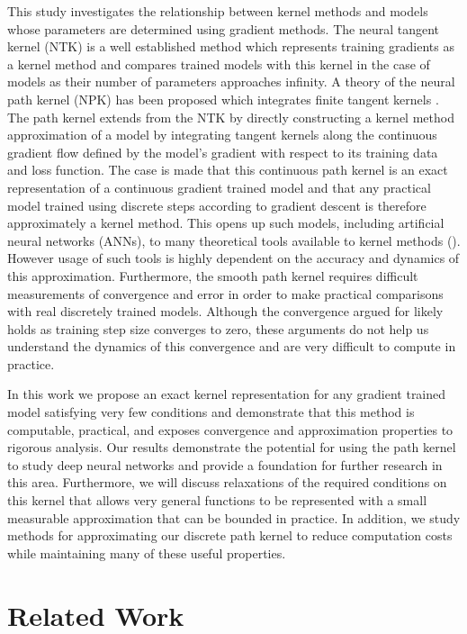 This study investigates the relationship between kernel methods and models whose parameters are determined using gradient methods. The neural tangent kernel (NTK) is a well established method which represents training gradients as a kernel method \cite{jacot2018neural} and compares trained models with this kernel in the case of models as their number of parameters approaches infinity. A theory of the neural path kernel (NPK) has been proposed which integrates finite tangent kernels \cite{domingos2020every}. The path kernel extends from the NTK by directly constructing a kernel method approximation of a model by integrating tangent kernels along the continuous gradient flow defined by the model's gradient with respect to its training data and loss function. The case is made that this continuous path kernel is an exact representation of a continuous gradient trained model and that any practical model trained using discrete steps according to gradient descent is  therefore approximately a kernel method. This opens up such models, including artificial neural networks (ANNs), to many theoretical tools available to kernel methods (\cite{ghojogh2021, shawe2004kernel, zhao2005extracting}). However usage of such tools is highly dependent on the accuracy and dynamics of this approximation. Furthermore, the smooth path kernel requires difficult measurements of convergence and error in order to make practical comparisons with real discretely trained models. Although the convergence argued for likely holds as training step size converges to zero, these arguments do not help us understand the dynamics of this convergence and are very difficult to compute in practice. 

In this work we propose an exact kernel representation for any gradient trained model satisfying very few conditions and demonstrate that this method is computable, practical, and exposes convergence and approximation properties to rigorous analysis. Our results demonstrate the potential for using the path kernel to study deep neural networks and provide a foundation for further research in this area. Furthermore, we will discuss relaxations of the required conditions on this kernel that allows very general functions to be represented with a small measurable approximation that can be bounded in practice. In addition, we study methods for approximating our discrete path kernel to reduce computation costs while maintaining many of these useful properties.

\section{Related Work}

